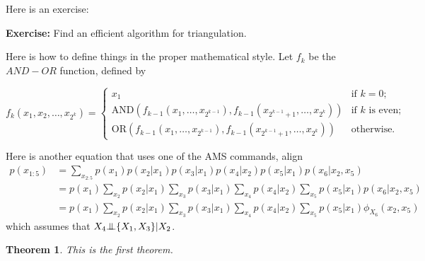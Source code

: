 \documentclass{article}
\newcounter{lecnum}
\newcommand{\indep}{{\bot\negthickspace\negthickspace\bot}}
\newtheorem{theorem}{Theorem}[lecnum]
\begin{document}
Here is an exercise:

{\bf Exercise:}  Find an efficient algorithm for triangulation.

Here is how to define things in the proper mathematical style.
Let $f_k$ be the $AND-OR$ function, defined by

\[ f_k(x_1, x_2, \ldots, x_{2^k}) = \left\{ \begin{array}{ll}

	x_1 & \mbox{if $k = 0$;} \\

	\mbox{AND}(f_{k-1}(x_1, \ldots, x_{2^{k-1}}),
	   f_{k-1}(x_{2^{k-1} + 1}, \ldots, x_{2^k}))
	 & \mbox{if $k$ is even;} \\

	\mbox{OR}(f_{k-1}(x_1, \ldots, x_{2^{k-1}}),
	   f_{k-1}(x_{2^{k-1} + 1}, \ldots, x_{2^k}))	
	& \mbox{otherwise.} 
	\end{array}
	\right. \]

Here is another equation that uses one of the AMS commands, align
{\small 
\begin{align*}
p(x_{1:5}) & = 
\sum_{x_{2:5}} 
p(x_1)p(x_2|x_1)p(x_3|x_1)p(x_4|x_2)
p(x_5|x_1)p(x_6|x_2,x_5) \\
& =  
p(x_1)\sum_{x_2}p(x_2|x_1)\sum_{x_3}p(x_3|x_1)\sum_{x_4}p(x_4|x_2)
\sum_{x_5}p(x_5|x_1)p(x_6|x_2,x_5) \\
& =  
p(x_1)\sum_{x_2}p(x_2|x_1)\sum_{x_3}p(x_3|x_1)\sum_{x_4}p(x_4|x_2)
\sum_{x_5}p(x_5|x_1)\phi_{X_6}(x_2,x_5)
\end{align*}
}
which assumes that $X_4 \indep \{ X_1, X_3 \} | X_2$.

\begin{theorem}
This is the first theorem.
\end{theorem}
\end{document}
